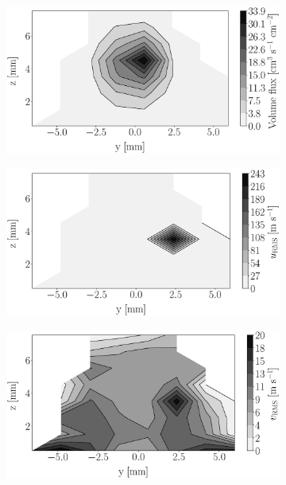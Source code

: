 \begin{figure}[h!]
\begin{subfigure}[b]{0.22\textwidth}
	\centering
   \includegraphics[scale=0.17]{./part2_developments/figures_ch5_resolved_JICF/injectors_SLI/uG100_dx20_x10_volume_flux_map.eps}
\end{subfigure}
   \hspace{0.17in}
\begin{subfigure}[b]{0.22\textwidth}
	\centering
   \includegraphics[scale=0.17]{./part2_developments/figures_ch5_resolved_JICF/injectors_SLI/uG100_dx20_x10_ux_rms_map.eps}
\end{subfigure}
   \hspace{0.17in}
\begin{subfigure}[b]{0.22\textwidth}
	\centering
   \includegraphics[scale=0.17]{./part2_developments/figures_ch5_resolved_JICF/injectors_SLI/uG100_dx20_x10_uy_rms_map.eps}

\end{subfigure}
\end{figure}
